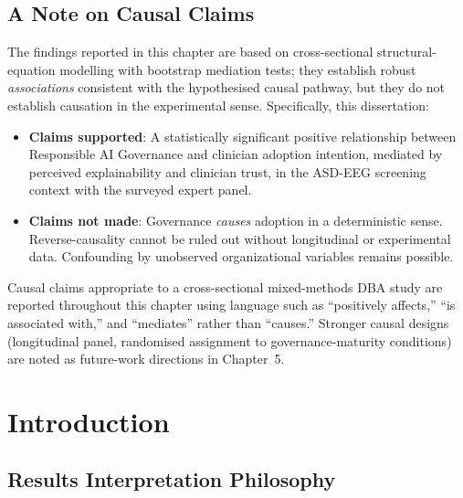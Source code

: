 \subsection*{A Note on Causal Claims}

\noindent The findings reported in this chapter are based on cross-sectional structural-equation modelling with bootstrap mediation tests; they establish robust \emph{associations} consistent with the hypothesised causal pathway, but they do not establish causation in the experimental sense. Specifically, this dissertation:

\begin{itemize}[leftmargin=*, itemsep=2pt]
    \item \textbf{Claims supported}: A statistically significant positive relationship between Responsible AI Governance and clinician adoption intention, mediated by perceived explainability and clinician trust, in the ASD-EEG screening context with the surveyed expert panel.
    \item \textbf{Claims not made}: Governance \emph{causes} adoption in a deterministic sense. Reverse-causality cannot be ruled out without longitudinal or experimental data. Confounding by unobserved organizational variables remains possible.
\end{itemize}

\noindent Causal claims appropriate to a cross-sectional mixed-methods DBA study are reported throughout this chapter using language such as ``positively affects,'' ``is associated with,'' and ``mediates'' rather than ``causes.'' Stronger causal designs (longitudinal panel, randomised assignment to governance-maturity conditions) are noted as future-work directions in Chapter~5.

\section{Introduction}






\subsection{Results Interpretation Philosophy}
\label{sec:results_philosophy}

